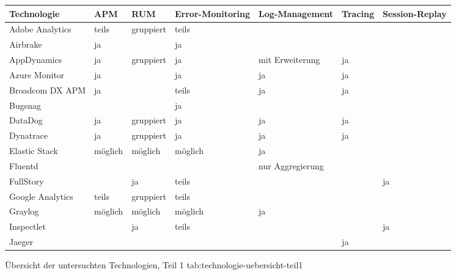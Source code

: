 %
{
\begin{tabular}{|p{2.25cm}|p{1.5cm}|p{2.0cm}|p{3.0cm}|p{3.0cm}|p{1.5cm}|p{2.5cm}|}
\hline
Technologie & APM & RUM & Error-Mo\-ni\-tor\-ing & Log-Management & Tracing & Session-Replay \\
\hline
Adobe Analytics & teils & gruppiert & teils &  &  &  \\
\hline
Airbrake & ja &  & ja &  &  &  \\
\hline
AppDynamics & ja & gruppiert & ja & mit Erweiterung & ja &  \\
\hline
Azure Monitor & ja &  & ja & ja & ja &  \\
\hline
Broadcom DX APM & ja &  & teils & ja & ja &  \\
\hline
Bugsnag &  &  & ja &  &  &  \\
\hline
DataDog & ja & gruppiert & ja & ja & ja &  \\
\hline
Dynatrace & ja & gruppiert & ja & ja & ja &  \\
\hline
Elastic Stack & möglich & möglich & möglich & ja &  &  \\
\hline
Fluentd &  &  &  & nur Aggregierung &  &  \\
\hline
FullStory &  & ja & teils &  &  & ja \\
\hline
Google Analytics & teils & gruppiert & teils &  &  &  \\
\hline
Graylog & möglich & möglich & möglich & ja &  &  \\
\hline
Inspectlet &  & ja & teils &  &  & ja \\
\hline
Jaeger &  &  &  &  & ja &  \\
\hline
\end{tabular}
}
{Übersicht der untersuchten Technologien, Teil 1}
{tab:technologie-uebersicht-teil1}

